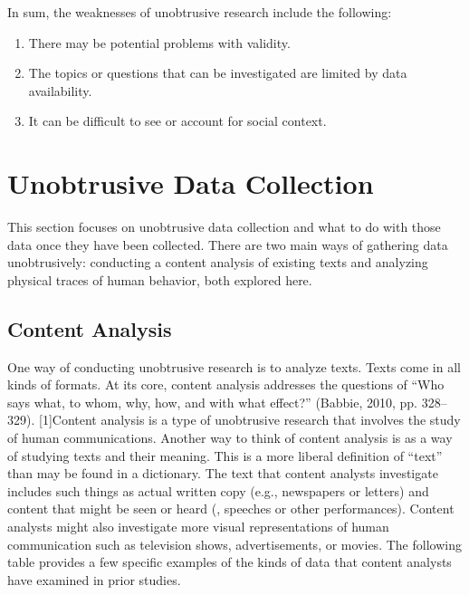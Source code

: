 In sum, the weaknesses of unobtrusive research include the following:

\begin{enumerate}
	\item There may be potential problems with validity.
	\item The topics or questions that can be investigated are limited by data availability.
	\item It can be difficult to see or account for social context.
\end{enumerate}

\section{Unobtrusive Data Collection}

This section focuses on unobtrusive data collection and what to do with those data once they have been collected. There are two main ways of gathering data unobtrusively: conducting a content analysis of existing texts and analyzing physical traces of human behavior, both explored here.

\subsection{Content Analysis}

One way of conducting unobtrusive research is to analyze texts. Texts come in all kinds of formats. At its core, content analysis addresses the questions of ``Who says what, to whom, why, how, and with what effect?'' (Babbie, 2010, pp. 328–329). [1]Content analysis is a type of unobtrusive research that involves the study of human communications. Another way to think of content analysis is as a way of studying texts and their meaning. This is a more liberal definition of ``text'' than may be found in a dictionary. The text that content analysts investigate includes such things as actual written copy (e.g., newspapers or letters) and content that might be seen or heard (\eg, speeches or other performances). Content analysts might also investigate more visual representations of human communication such as television shows, advertisements, or movies. The following table provides a few specific examples of the kinds of data that content analysts have examined in prior studies. 

